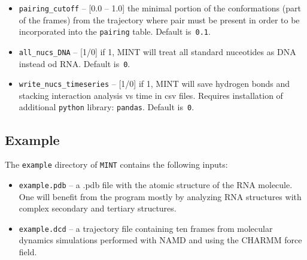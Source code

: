 \documentclass[12pt]{article}
\begin{document}
\begin{itemize}
\item {\tt pairing\_cutoff} -- [0.0 -- 1.0] the minimal portion of the conformations (part of the frames) from the trajectory where pair must be present in order to be incorporated into the {\tt pairing} table. Default is~{\tt 0.1}.
\item {\tt all\_nucs\_DNA} -- [1/0] if 1, MINT will treat all standard nuceotides as DNA instead od RNA. Default is~{\tt 0}.
\item {\tt write\_nucs\_timeseries} -- [1/0] if 1, MINT will save hydrogen bonds and stacking interaction analysis vs time in csv files. Requires installation of additional {\tt python} library: {\tt pandas}. Default is~{\tt 0}.
\end{itemize}


\subsection{Example} \label{Example_sec}
The {\tt example} directory of {\tt MINT} contains the following inputs:
\begin{itemize}
\item {\tt example.pdb}  -- a .pdb file with the atomic structure of the RNA molecule. One will benefit from the program mostly by analyzing RNA structures with complex secondary and tertiary structures.
\item {\tt example.dcd}  -- a trajectory file containing ten frames from molecular dynamics simulations performed with NAMD \cite{Phillips2005} and using the CHARMM force field.
\end{itemize}
\end{document}
